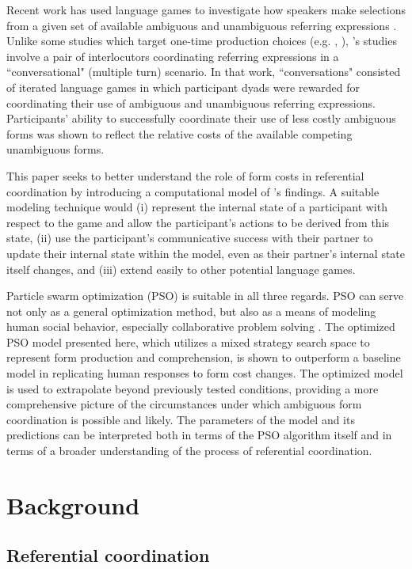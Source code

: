 \documentclass[a4paper,11pt]{article}
\begin{document}
Recent work has used language games to investigate how speakers make selections from a given set of available ambiguous and unambiguous referring expressions \cite{rohde2012,degen2012,frank2012}. Unlike some studies which target one-time production choices (e.g. \citeauthor{degen2012}, ), \citeauthor{rohde2012}'s studies involve a pair of interlocutors coordinating referring expressions in a ``conversational" (multiple turn) scenario. In that work, ``conversations" consisted of iterated language games in which participant dyads were rewarded for coordinating their use of ambiguous and unambiguous referring expressions. Participants' ability to successfully coordinate their use of less costly ambiguous forms was shown to reflect the relative costs of the available competing unambiguous forms. 

This paper seeks to better understand the role of form costs in referential coordination by introducing a computational model of \citeauthor{rohde2012}'s findings. A suitable modeling technique would (i) represent the internal state of a participant with respect to the game and allow the participant's actions to be derived from this state, (ii) use the participant's communicative success with their partner to update their internal state within the model, even as their partner's internal state itself changes, and (iii) extend easily to other potential language games. 

Particle swarm optimization (PSO) is suitable in all three regards. PSO can serve not only as a general optimization method, but also as a means of modeling human social behavior, especially collaborative problem solving \cite{kennedy1997}. The optimized PSO model presented here, which utilizes a mixed strategy search space to represent form production and comprehension, is shown to outperform a baseline model in replicating human responses to form cost changes. The optimized model is used to extrapolate beyond previously tested conditions, providing a more comprehensive picture of the circumstances under which ambiguous form coordination is possible and likely. The parameters of the model and its predictions can be interpreted both in terms of the PSO algorithm itself and in terms of a broader understanding of the process of referential coordination.


\section{Background}
\subsection{Referential coordination}
\end{document}
